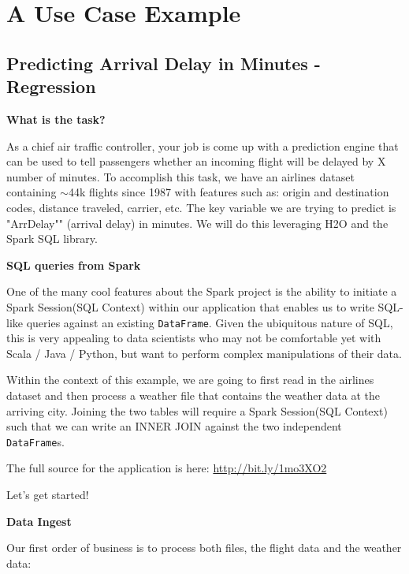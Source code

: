 \section{A Use Case Example}


\subsection{Predicting Arrival Delay in Minutes - Regression}

\textbf{What is the task?}

As a chief air traffic controller, your job is come up with a prediction engine that can be used to tell passengers whether an incoming flight will be delayed by X number of minutes. To accomplish this task, we have an airlines dataset containing ${\sim}$44k flights since 1987 with features such as: origin and destination codes, distance traveled, carrier, etc.  The key variable we are trying to predict is "ArrDelay"" (arrival delay) in minutes. We will do this leveraging H2O and the Spark SQL library.

\textbf{SQL queries from Spark}

One of the many cool features about the Spark project is the ability to initiate a Spark Session(SQL Context) within our application that enables us to write SQL-like queries against an existing \texttt{DataFrame}. Given the ubiquitous nature of SQL, this is very appealing to data scientists who may not be comfortable yet with Scala / Java / Python, but want to perform complex manipulations of their data.

Within the context of this example, we are going to first read in the airlines dataset and then process a weather file that contains the weather data at the arriving city. Joining the two tables will require a Spark Session(SQL Context) such that we can write an INNER JOIN against the two independent \texttt{DataFrame}s.  

The full source for the application is here: \url{http://bit.ly/1mo3XO2}

Let's get started!

\newpage
\textbf{Data Ingest}

Our first order of business is to process both files, the flight data and the weather data:

